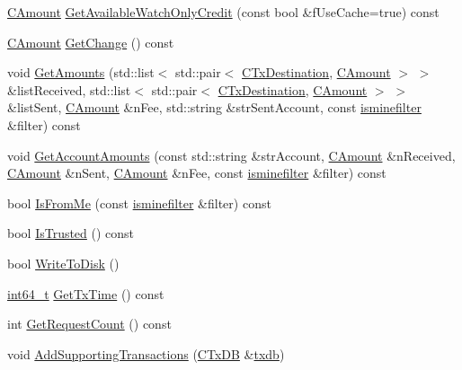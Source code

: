 \begin{DoxyCompactItemize}
\hyperlink{amount_8h_a4eaf3a5239714d8c45b851527f7cb564}{C\+Amount} \hyperlink{class_c_wallet_tx_abfe5cf87f8a2704e526506d9680659c9}{Get\+Available\+Watch\+Only\+Credit} (const bool \&f\+Use\+Cache=true) const 
\item 
\hyperlink{amount_8h_a4eaf3a5239714d8c45b851527f7cb564}{C\+Amount} \hyperlink{class_c_wallet_tx_afbc869129f88b9a5bd33b67ab90b0061}{Get\+Change} () const 
\item 
void \hyperlink{class_c_wallet_tx_af46d43266d668fe7152a086f5446d529}{Get\+Amounts} (std\+::list$<$ std\+::pair$<$ \hyperlink{keystore_8h_a8f46ecba0ddeb036be6b58d6ed1909cd}{C\+Tx\+Destination}, \hyperlink{amount_8h_a4eaf3a5239714d8c45b851527f7cb564}{C\+Amount} $>$ $>$ \&list\+Received, std\+::list$<$ std\+::pair$<$ \hyperlink{keystore_8h_a8f46ecba0ddeb036be6b58d6ed1909cd}{C\+Tx\+Destination}, \hyperlink{amount_8h_a4eaf3a5239714d8c45b851527f7cb564}{C\+Amount} $>$ $>$ \&list\+Sent, \hyperlink{amount_8h_a4eaf3a5239714d8c45b851527f7cb564}{C\+Amount} \&n\+Fee, std\+::string \&str\+Sent\+Account, const \hyperlink{script_8h_aaa5e1639d76aef50f70532acc3302c4b}{isminefilter} \&filter) const 
\item 
void \hyperlink{class_c_wallet_tx_ae8179fbe6db1204884f0bb7bac4e8fc1}{Get\+Account\+Amounts} (const std\+::string \&str\+Account, \hyperlink{amount_8h_a4eaf3a5239714d8c45b851527f7cb564}{C\+Amount} \&n\+Received, \hyperlink{amount_8h_a4eaf3a5239714d8c45b851527f7cb564}{C\+Amount} \&n\+Sent, \hyperlink{amount_8h_a4eaf3a5239714d8c45b851527f7cb564}{C\+Amount} \&n\+Fee, const \hyperlink{script_8h_aaa5e1639d76aef50f70532acc3302c4b}{isminefilter} \&filter) const 
\item 
bool \hyperlink{class_c_wallet_tx_a5eab277896d1b553676316b862e2014b}{Is\+From\+Me} (const \hyperlink{script_8h_aaa5e1639d76aef50f70532acc3302c4b}{isminefilter} \&filter) const 
\item 
bool \hyperlink{class_c_wallet_tx_af2eff3b849af124cdf869fc03f587972}{Is\+Trusted} () const 
\item 
bool \hyperlink{class_c_wallet_tx_ada0e71d717dd360faf047de54eef4942}{Write\+To\+Disk} ()
\item 
\hyperlink{stdint_8h_adec1df1b8b51cb32b77e5b86fff46471}{int64\+\_\+t} \hyperlink{class_c_wallet_tx_a25fdd940fcdd2ea9d05547c5c789fc0d}{Get\+Tx\+Time} () const 
\item 
int \hyperlink{class_c_wallet_tx_a78d48485ea1680bdc3e2ffc03a500164}{Get\+Request\+Count} () const 
\item 
void \hyperlink{class_c_wallet_tx_a3594f3eabada273c1eb9ab25da38d204}{Add\+Supporting\+Transactions} (\hyperlink{class_c_tx_d_b}{C\+Tx\+D\+B} \&\hyperlink{txdb-leveldb_8cpp_a72eff8ae1d84de13daf97a61b8c02bc6}{txdb})

\end{DoxyCompactItemize}
